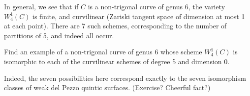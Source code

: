 In general, we see that if $C$ is a non-trigonal curve of genus 6, the variety $W^1_4(C)$ is finite, and curvilinear (Zariski tangent space of dimension at most 1 at each point). There are 7 such schemes, corresponding to the number of partitions of 5, and indeed all occur.

\begin{exercise}
Find an example of a non-trigonal curve of genus 6 whose scheme $W^1_4(C)$ is isomorphic to each of the curvilinear schemes of degree 5 and dimension 0.
\end{exercise}

Indeed, the seven possibilities here correspond exactly to the seven isomorphism classes of weak del Pezzo quintic surfaces. (Exercise? Cheerful fact?)



%
%
%
%




